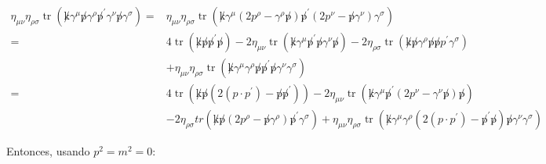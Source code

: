 \begin{equation}
  \begin{aligned}
  \eta_{\mu \nu} \eta_{\rho \sigma} \operatorname{tr}\left(\not k \gamma^\mu \not p \gamma^\rho \not p^{\prime} \gamma^\nu \not p \gamma^\sigma\right)= & \eta_{\mu \nu} \eta_{\rho \sigma} \operatorname{tr}\left(\not k \gamma^\mu\left(2 p^\rho-\gamma^\rho \not p\right) \not p^{\prime}\left(2 p^\nu-\not p \gamma^\nu\right) \gamma^\sigma\right) \\
  = & 4 \operatorname{tr}\left(\not k \not p \not p^{\prime} \not p\right)-2 \eta_{\mu \nu} \operatorname{tr}\left(\not k \gamma^\mu \not p^{\prime} \not p \gamma^\nu \not p\right)-2 \eta_{\rho \sigma} \operatorname{tr}\left(\not k \not p \gamma^\rho \not p \not p p^{\prime} \gamma^\sigma\right) \\
  & +\eta_{\mu \nu} \eta_{\rho \sigma} \operatorname{tr}\left(\not k \gamma^\mu \gamma^\rho \not p \not p^{\prime} \not p \gamma^\nu \gamma^\sigma\right) \\
  = & 4 \operatorname{tr}\left(\not k \not p\left(2\left(p \cdot p^{\prime}\right)-\not p \not p^{\prime}\right)\right)-2 \eta_{\mu \nu} \operatorname{tr}\left(\not k \gamma^\mu \not p^{\prime}\left(2 p^\nu-\gamma^\nu \not p\right) \not p\right) \\
  & -2 \eta_{\rho \sigma} t r\left(\not k \not p\left(2 p^\rho-\not p \gamma^\rho\right) \not p^{\prime} \gamma^\sigma\right)+\eta_{\mu \nu} \eta_{\rho \sigma} \operatorname{tr}\left(\not k \gamma^\mu \gamma^\rho\left(2\left(p \cdot p^{\prime}\right)-\not p^\prime \not p\right) \not p \gamma^\nu \gamma^\sigma\right)
  \end{aligned}
  \end{equation}

Entonces, usando $ p^2 = m^2 = 0 $:

